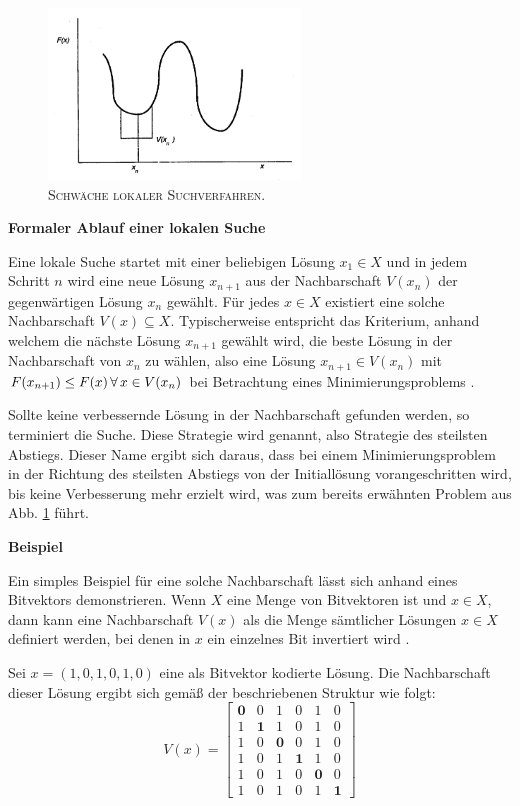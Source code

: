 \vfill
\pagebreak

\begin{figure}[H]
\centering
\includegraphics[width=0.6\textwidth]{img/local_minimum.png}
\caption{\textsc{Schwäche lokaler Suchverfahren. \cite{Pirlot1996}}}
\label{fig:local_search_weakness}
\end{figure}

\textbf{Formaler Ablauf einer lokalen Suche}

Eine lokale Suche startet mit einer beliebigen Lösung $x_1 \in X$ und in jedem Schritt $n$
wird eine neue Lösung $x_{n+1}$ aus der Nachbarschaft $V(x_n)$ der gegenwärtigen Lösung $x_n$ gewählt.
Für jedes $x \in X$ existiert eine solche Nachbarschaft $V(x) \subseteq X$.
Typischerweise entspricht das Kriterium, anhand welchem die nächste Lösung $x_{n+1}$ gewählt wird,
die beste Lösung in der Nachbarschaft von $x_n$ zu wählen, also eine Lösung $x_{n+1} \in V(x_n)$
mit $F(x_{n+1}) \leq F(x) \thinspace \forall \thinspace x \in V(x_n)$ bei Betrachtung eines
Minimierungsproblems \cite{Pirlot1996}.

Sollte keine verbessernde Lösung in der Nachbarschaft gefunden werden, so terminiert die Suche.
Diese Strategie wird  genannt, also Strategie des steilsten Abstiegs.
Dieser Name ergibt sich daraus, dass bei einem Minimierungsproblem in der Richtung des steilsten Abstiegs
von der Initiallösung vorangeschritten wird, bis keine Verbesserung mehr erzielt wird,
was zum bereits erwähnten Problem aus Abb. \ref{fig:local_search_weakness} führt.

\textbf{Beispiel}

Ein simples Beispiel für eine solche Nachbarschaft lässt sich anhand eines Bitvektors demonstrieren.
Wenn $X$ eine Menge von Bitvektoren ist und $x \in X$, dann kann eine Nachbarschaft $V(x)$ als die Menge
sämtlicher Lösungen $x \in X$ definiert werden, bei denen in $x$ ein einzelnes Bit invertiert wird \cite{Pirlot1996}.

Sei $x = (1, 0, 1, 0, 1, 0)$ eine als Bitvektor kodierte Lösung.
Die Nachbarschaft dieser Lösung ergibt sich gemäß der beschriebenen Struktur wie folgt:
\[
V(x) =
  \begin{bmatrix}
    \boldsymbol{0} & 0 & 1 & 0 & 1 & 0 \\
    1 & \boldsymbol{1} & 1 & 0 & 1 & 0 \\
    1 & 0 & \boldsymbol{0} & 0 & 1 & 0 \\
    1 & 0 & 1 & \boldsymbol{1} & 1 & 0 \\
    1 & 0 & 1 & 0 & \boldsymbol{0} & 0 \\
    1 & 0 & 1 & 0 & 1 & \boldsymbol{1}
  \end{bmatrix}
\]

